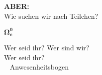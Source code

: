 \begin{frame} \Large
    \begin{center}
     \textcolor{LHCbDarkBlue}{\textbf{ABER:} }\\  \vspace{1cm}
     Wie suchen wir nach Teilchen?
    \end{center}\pause 
    \begin{center}  \vspace{1cm}
    \end{center}
\end{frame}
\begin{frame} \Huge\Huge
    \begin{center}
     \textcolor{LHCbDarkBlue}{$\mathbf{\Omega_c^0}$ }\\  \vspace{1cm}
 \end{center}
\end{frame}


\GroupPresentation \addtocounter{framenumber}{1}



\begin{frame}{Wer seid ihr?}
\Large Wer sind wir?  \\ \vspace{1cm}
    \Large Wer seid ihr? \\ \pause
    \large ~  Anwesenheitsbogen
\end{frame}

